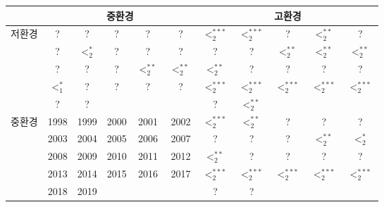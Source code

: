 \begin{tabular}{c|c|c|c|c|c|c|c|c|c|c}
\hline & \multicolumn{5}{c|}{중환경} & \multicolumn{5}{c}{고환경} \\
\hline \multirow{5}{*}{저환경} & ? & ? & ? & ? & ? & $<_{2}^{***}$ & $<_{2}^{***}$ & ? & $<_{2}^{**}$ & ? \\
\cline{2-11} & ? & $<_{2}^{*}$ & ? & ? & ? & ? & ? & $<_{2}^{**}$ & $<_{2}^{**}$ & $<_{2}^{**}$ \\
\cline{2-11} & ? & ? & ? & $<_{2 }^{**}$ & $<_{2 }^{**}$ & $<_{2 }^{**}$ & ? & ? & ? & ? \\
\cline{2-11} & $<_{1}^{*}$ & ? & ? & ? & ? & $<_{2}^{***}$ & $<_{2}^{***}$ & $<_{2}^{***}$ & $<_{2}^{***}$ & $<_{2}^{***}$ \\
\cline{2-11} & ? & ? &  &  &  & ? & $<_{2}^{**}$ &  &  &  \\
\hline \multirow{5}{*}{중환경} & 1998 & 1999 & 2000 & 2001 & 2002 & $<_{2}^{***}$ & $<_{2}^{**}$ & ? & ? & ? \\
\cline{2-11} & 2003 & 2004 & 2005 & 2006 & 2007 & ? & ? & ? & $<_{2}^{**}$ &$<_{2}^{*}$ \\
\cline{2-11} & 2008 & 2009 & 2010 & 2011 & 2012 & $<_{2}^{**}$ & ? & ? & ? & ? \\
\cline{2-11} & 2013 & 2014 & 2015 & 2016 & 2017 & $<_{2}^{***}$ & $<_{2}^{***}$ & $<_{2}^{***}$ & $<_{2}^{***}$ & $<_{2}^{***}$ \\
\cline{2-11} & 2018 & 2019 & &  &  & ? & ? &  &  &  \\
\hline
\end{tabular}